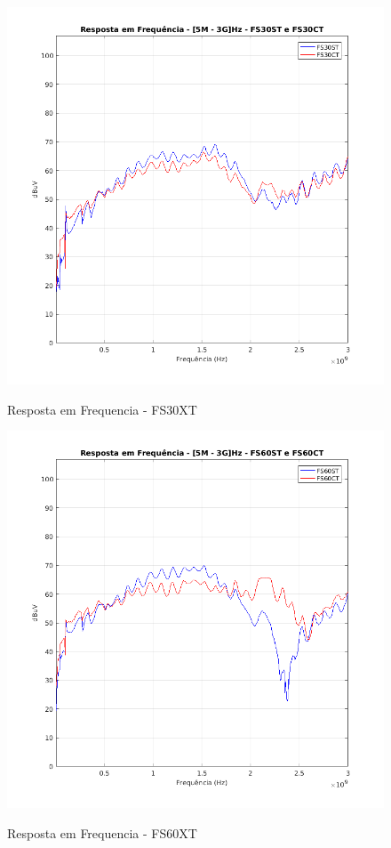 \begin{figure}[H]
	\centering 
	\caption{Resposta em Frequencia - FS30XT}
	\includegraphics[scale=0.7]{./img/FS30XT}
	\label{fig:FS30XT}
\end{figure}

\begin{figure}[H]
	\centering 
	\caption{Resposta em Frequencia - FS60XT}
	\includegraphics[scale=0.7]{./img/FS60XT}
	\label{fig:FS60XT}
\end{figure}

